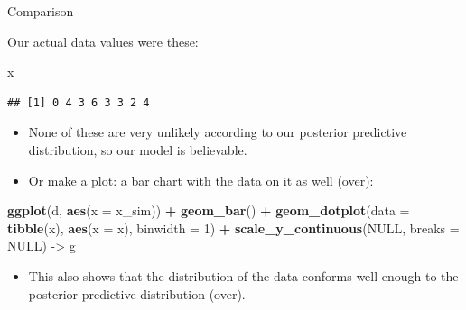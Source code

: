 \documentclass[
  ignorenonframetext,
]{beamer}
\newenvironment{Shaded}{\begin{snugshade}}{\end{snugshade}}
\newcommand{\DataTypeTok}[1]{\textcolor[rgb]{0.13,0.29,0.53}{#1}}
\newcommand{\DecValTok}[1]{\textcolor[rgb]{0.00,0.00,0.81}{#1}}
\newcommand{\KeywordTok}[1]{\textcolor[rgb]{0.13,0.29,0.53}{\textbf{#1}}}
\newcommand{\NormalTok}[1]{#1}
\newcommand{\OperatorTok}[1]{\textcolor[rgb]{0.81,0.36,0.00}{\textbf{#1}}}
\newcommand{\OtherTok}[1]{\textcolor[rgb]{0.56,0.35,0.01}{#1}}
\newcommand{\StringTok}[1]{\textcolor[rgb]{0.31,0.60,0.02}{#1}}
\providecommand{\tightlist}{%
  \setlength{\itemsep}{0pt}\setlength{\parskip}{0pt}}
\begin{document}
\begin{frame}[fragile]{Comparison}
\protect\hypertarget{comparison}{}

Our actual data values were these:

\begin{Shaded}
\begin{Highlighting}[]
\NormalTok{x}
\end{Highlighting}
\end{Shaded}

\begin{verbatim}
## [1] 0 4 3 6 3 3 2 4
\end{verbatim}

\begin{itemize}
\tightlist
\item
  None of these are very unlikely according to our posterior predictive
  distribution, so our model is believable.
\item
  Or make a plot: a bar chart with the data on it as well (over):
\end{itemize}

\begin{Shaded}
\begin{Highlighting}[]
\KeywordTok{ggplot}\NormalTok{(d, }\KeywordTok{aes}\NormalTok{(}\DataTypeTok{x =}\NormalTok{ x_sim)) }\OperatorTok{+}\StringTok{ }\KeywordTok{geom_bar}\NormalTok{() }\OperatorTok{+}
\StringTok{  }\KeywordTok{geom_dotplot}\NormalTok{(}\DataTypeTok{data =} \KeywordTok{tibble}\NormalTok{(x), }\KeywordTok{aes}\NormalTok{(}\DataTypeTok{x =}\NormalTok{ x), }\DataTypeTok{binwidth =} \DecValTok{1}\NormalTok{) }\OperatorTok{+}
\StringTok{  }\KeywordTok{scale_y_continuous}\NormalTok{(}\OtherTok{NULL}\NormalTok{, }\DataTypeTok{breaks =} \OtherTok{NULL}\NormalTok{) ->}\StringTok{ }\NormalTok{g}
\end{Highlighting}
\end{Shaded}

\begin{itemize}
\tightlist
\item
  This also shows that the distribution of the data conforms well enough
  to the posterior predictive distribution (over).
\end{itemize}

\end{frame}
\end{document}
